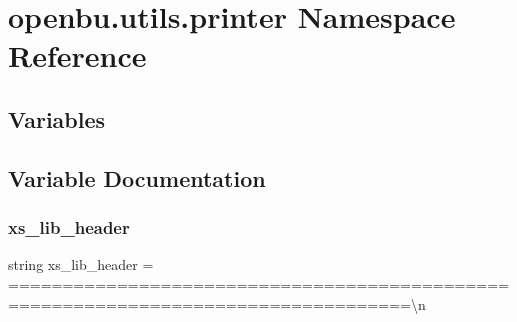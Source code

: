 \hypertarget{namespaceopenbu_1_1utils_1_1printer}{}\section{openbu.\+utils.\+printer Namespace Reference}
\label{namespaceopenbu_1_1utils_1_1printer}
\subsection*{Variables}


\subsection{Variable Documentation}
\mbox{\label{namespaceopenbu_1_1utils_1_1printer_a32bf9a4ee9842df0bae1bce2a566401f}} 
\subsubsection{\texorpdfstring{xs\+\_\+lib\+\_\+header}{xs\_lib\_header}}
{\footnotesize\ttfamily string xs\+\_\+lib\+\_\+header = \textquotesingle{}===================================================================================\textbackslash{}n\textquotesingle{}}

